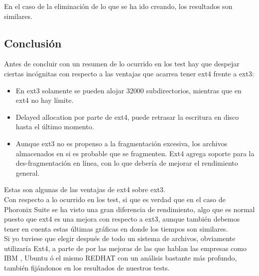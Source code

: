 En el caso de la eliminación de lo que se ha ido creando, los resultados son similares.
\newpage
\subsection{Conclusión}

Antes de concluir con un resumen de lo ocurrido en los test hay que despejar ciertas incógnitas con respecto a las ventajas que acarrea tener ext4 frente a ext3:
\begin{itemize}
	\item En ext3 solamente se pueden alojar 32000 subdirectorios, mientras que en ext4 no hay límite.
	\item Delayed allocation por parte de ext4, puede retrasar la escritura en disco hasta el último momento.
	\item Aunque ext3 no es propenso a la fragmentación excesiva, los archivos almacenados en si es probable que se fragmenten. Ext4 agrega soporte para la des-fragmentación en línea, con lo que debería de mejorar el rendimiento general. 
\end{itemize}

Estas son algunas de las ventajas de ext4 sobre ext3.
\\
Con respecto a lo ocurrido en los test, si que es verdad que en el caso de Phoronix Suite se ha visto una gran diferencia de rendimiento, algo que es normal puesto que ext4 es una mejora con respecto a ext3, aunque también debemos tener en cuenta estas últimas gráficas en donde los tiempos son similares. 
\\
Si yo tuviese que elegir después de todo un sistema de archivos, obviamente utilizaría Ext4, a parte de por las mejoras de las que hablan las empresas como IBM \cite{FILESYSTEMIBM}, Ubuntu \cite{FILESYSTEM} ó el mismo REDHAT \cite{REDHATESTUDIO} con un análisis bastante más profundo, también fijándonos en los resultados de nuestros tests.
\newpage


